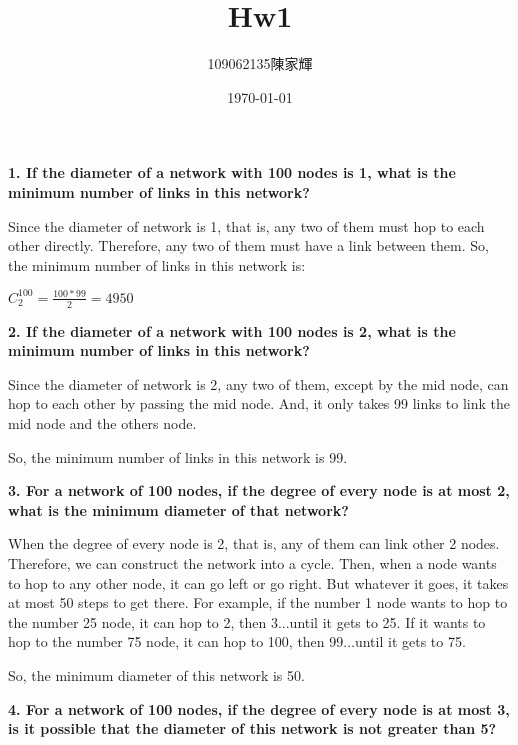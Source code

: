\documentclass[12pt]{article}
\title{Hw1}
\author{109062135陳家輝}
\date{\today}
\begin{document}
\maketitle
\noindent
\textbf{
    1. If the diameter of a network with 100 nodes is 1, what is the minimum number of links in this network?
}
\begin{flushleft}
    Since the diameter of network is 1, that is,
    any two of them must hop to each other directly.
    Therefore, any two of them must have a link between them.
    So, the minimum number of links in this network is:
\end{flushleft}

\begin{center}
    $C_{2}^{100}=\frac{100*99}{2}=4950 $
\end{center}


\noindent
\textbf{
    2. If the diameter of a network with 100 nodes is 2, what is the minimum number of links in this network?
}
\begin{flushleft}
    \qquad
    Since the diameter of network is 2,
    any two of them, except by the mid node, can hop to each other by passing the mid node.
    And, it only takes 99 links to link the mid node and the others node.

    \qquad
    So, the minimum number of links in this network is 99.
\end{flushleft}

\noindent
\textbf{
    3. For a network of 100 nodes, if the degree of every node is at most 2, what is the minimum diameter of that network?
}

\begin{flushleft}
    \qquad
    When the degree of every node is 2, that is, any of them can link other 2 nodes.
    Therefore, we can construct the network into a cycle.
    Then, when a node wants to hop to any other node, it can go left or go right.
    But whatever it goes, it takes at most 50 steps to get there.
    For example, if the number 1 node wants to hop to the number 25 node,
    it can hop to 2, then 3...until it gets to 25.
    If it wants to hop to the number 75 node,
    it can hop to 100, then 99...until it gets to 75.

    \qquad
    So, the minimum diameter of this network is 50.
\end{flushleft}

\noindent
\textbf{
    4. For a network of 100 nodes, if the degree of every node is at most 3, is it possible that the diameter of this network is not greater than 5?
}
\end{document}
